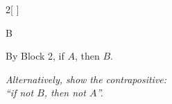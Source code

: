 \begin{figure}
\begin{multicols}{2}[
      ]
{\begin{steps}
\begin{steps}
        \item[2.3.] B
          
        \end{steps}
        
      \item[3.] By Block 2, if $A$, then $B$.
      \end{steps}

      \vspace*{1pt}

      \dotfill

      \emph{Alternatively, show the contrapositive:\\\hspace*{3em} ``if not $B$, then not $A$''.}

      \vspace*{1pt}
    }

    \newpage
    








\end{multicols}
\end{figure}
